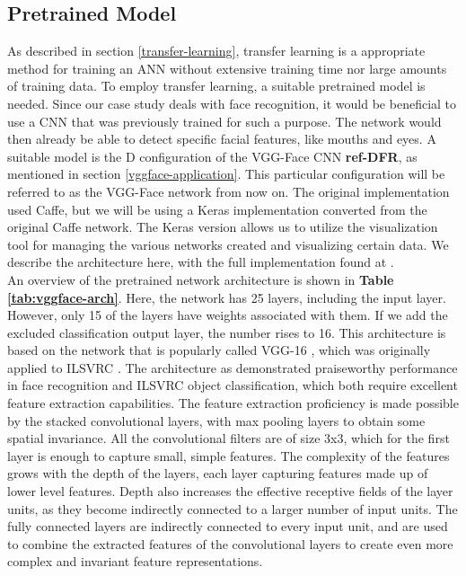 

\subsection{Pretrained Model}


As described in section \ref{transfer-learning}, transfer learning is a appropriate method for training an ANN without extensive training time nor large amounts of training data. To employ transfer learning, a suitable pretrained model is needed. Since our case study deals with face recognition, it would be beneficial to use a CNN that was previously trained for such a purpose. The network would then already be able to detect specific facial features, like mouths and eyes. A suitable model is the D configuration of the VGG-Face CNN \textbf{ref-DFR}, as mentioned in section \ref{vggface-application}. This particular configuration will be referred to as the VGG-Face network from now on. The original implementation used Caffe, but we will be using a Keras implementation converted from the original Caffe network. The Keras version allows us to utilize the visualization tool for managing the various networks created and visualizing certain data. We describe the architecture here, with the full implementation found at \cite{vggface-github}. \\

\noindent An overview of the pretrained network architecture is shown in \textbf{Table \ref{tab:vggface-arch}}. Here, the network has 25 layers, including the input layer. However, only 15 of the layers have weights associated with them. If we add the excluded classification output layer, the number rises to 16. This architecture is based on the network that is popularly called VGG-16 \cite{vgg}, which was originally applied to ILSVRC \cite{imagenet}. The architecture as demonstrated praiseworthy performance in face recognition and ILSVRC object classification, which both require excellent feature extraction capabilities. The feature extraction proficiency is made possible by the stacked convolutional layers, with max pooling layers to obtain some spatial invariance. All the convolutional filters are of size 3x3, which for the first layer is enough to capture small, simple features. The complexity of the features grows with the depth of the layers, each layer capturing features made up of lower level features. Depth also increases the effective receptive fields of the layer units, as they become indirectly connected to a larger number of input units. The fully connected layers are indirectly connected to every input unit, and are used to combine the extracted features of the convolutional layers to create even more complex and invariant feature representations. \\

